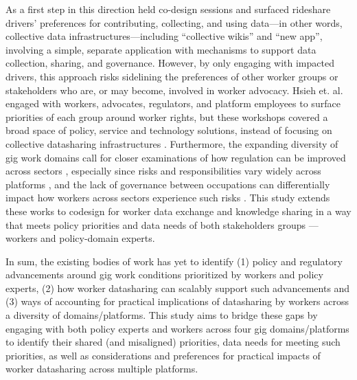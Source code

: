 As a first step in this direction \citet{uuapp} held co-design sessions and surfaced rideshare drivers' {preferences for contributing, collecting, and using data---in other words, }collective data infrastructures---including ``collective wikis'' and ``new app'', {involving a simple, separate application with mechanisms }to support data collection, sharing, and governance. However, {by only engaging with impacted drivers}, {this approach risks sidelining the preferences of} other worker groups or stakeholders {who are, or may become,} involved in worker advocacy. Hsieh et. al. {engaged with workers,} advocates, regulators, and platform employees {to surface} priorities {of each group} around worker rights, {but these workshops covered a broad space of policy, service and technology solutions, instead of focusing on} collective datasharing infrastructures \cite{xAXX}. 
{Furthermore, the expanding diversity of gig work domains call for closer examinations of how regulation can be improved across sectors \cite{4Qr5}, especially since risks and responsibilities vary widely across platforms \cite{sannon2022privacy}, and the lack of governance between occupations can differentially impact how workers across sectors experience such risks \cite{disruption, mastracci2016breaking, basu2015health}.}
{This study extends these works to {codesign for worker data exchange and knowledge sharing in a way that meets policy priorities and data needs of both stakeholders groups --- workers and policy-domain experts.}
}

{In sum, the existing bodies of work has yet to identify (1) policy and regulatory advancements around gig work conditions prioritized by workers and policy experts, (2) how worker datasharing can scalably support such advancements and (3) ways of accounting for practical implications of 
datasharing by workers across a diversity of domains/platforms. This study aims to bridge these gaps by engaging with both policy experts and workers across four gig domains/platforms to identify their shared (and misaligned) priorities, data needs for meeting such priorities, as well as considerations and preferences for practical impacts of worker datasharing across multiple platforms.}

